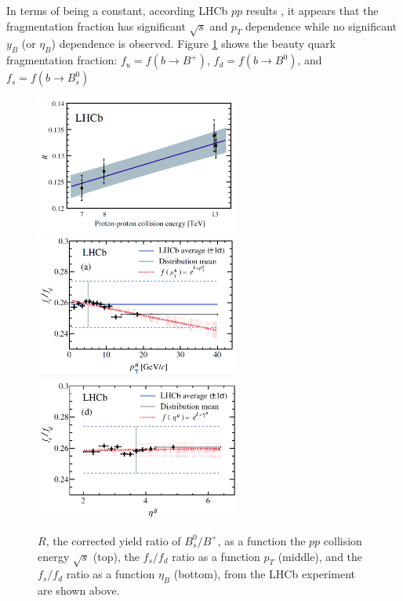 In terms of being a constant, according LHCb $pp$ results \cite{LHCbFF}, it appears that the fragmentation fraction has significant $\sqrt s$ and $p_T$ dependence while no significant $y_B$ (or $\eta_B$) dependence is observed. Figure \ref{BeautyFFLHCb} shows the beauty quark fragmentation fraction: $f_u = f(b \rightarrow B^+)$, $f_d = f(b \rightarrow B^0)$, and $f_s = f(b \rightarrow B_s^0)$

 \begin{figure}[hbtp]
\begin{center}
\includegraphics[width=0.60\textwidth]{Figures/Chapter1/LHCbFFs.png}
\includegraphics[width=0.60\textwidth]{Figures/Chapter1/LHCbFFpT.png}
\includegraphics[width=0.60\textwidth]{Figures/Chapter1/LHCbFFy.png}
\caption{ $R$, the corrected yield ratio of $B^0_s/B^+$, as a function the $pp$ collision energy $\sqrt s$ (top), the $f_s/f_d$ ratio as a function $p_T$ (middle), and the $f_s/f_d$ ratio as a function $\eta_B$ (bottom), from the LHCb experiment are shown above.}
\label{BeautyFFLHCb}
\end{center}
\end{figure}   


